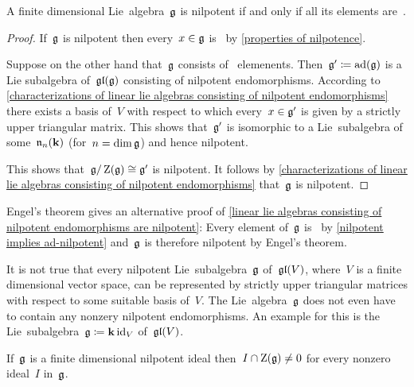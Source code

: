 \begin{theorem}[Engel]
  A finite dimensional Lie~algebra~$\mathfrak{g}$ is nilpotent if and only if all its elements are~{\adnilpotent}.
\end{theorem}


\begin{proof}
  If~$\mathfrak{g}$ is nilpotent then every~$x \in \mathfrak{g}$ is~{\adnilpotent} by \cref{properties of nilpotence}.
 
  Suppose on the other hand that~$\mathfrak{g}$ consists of~{\adnilpotent} elemenents.
  Then~$\mathfrak{g}' \coloneqq \operatorname{ad}(\mathfrak{g})$ is a Lie subalgebra of~$\mathfrak{gl}(\mathfrak{g})$ consisting of nilpotent endomorphisms.
  According to \cref{characterizations of linear lie algebras consisting of nilpotent endomorphisms} there exists a basis of~$V$ with respect to which every~$x \in \mathfrak{g}'$ is given by a strictly upper triangular matrix.
  This shows that~$\mathfrak{g}'$ is isomorphic to a Lie~subalgebra of some~$\mathfrak{n}_n(\mathbf{k})$ (for~$n = \dim \mathfrak{g}$) and hence nilpotent.
  
  This shows that~$\mathfrak{g}/\operatorname{Z}(\mathfrak{g}) \cong \mathfrak{g}'$ is nilpotent.
  It follows by \cref{characterizations of linear lie algebras consisting of nilpotent endomorphisms} that~$\mathfrak{g}$ is nilpotent.
\end{proof}


\begin{remark}
  Engel’s theorem gives an alternative proof of \cref{linear lie algebras consisting of nilpotent endomorphisms are nilpotent}:
  Every element of~$\mathfrak{g}$ is~{\adnilpotent} by \cref{nilpotent implies ad-nilpotent} and~$\mathfrak{g}$ is therefore nilpotent by Engel’s theorem.
\end{remark}


\begin{remark}
  It is not true that every nilpotent Lie~subalgebra~$\mathfrak{g}$ of~$\mathfrak{gl}(V)$, where~$V$ is a finite dimensional vector space, can be represented by strictly upper triangular matrices with respect to some suitable basis of~$V$.
  The Lie~algebra~$\mathfrak{g}$ does not even have to contain any nonzery nilpotent endomorphisms.
  An example for this is the {\onedimensional} Lie~subalgebra~$\mathfrak{g} \coloneqq \mathbf{k} \, {\operatorname{id}_V}$ of~$\mathfrak{gl}(V)$.
\end{remark}


\begin{corollary}
  \label{ideals in nilpotent does intersection center}
  If~$\mathfrak{g}$ is a finite dimensional nilpotent ideal then~$I \cap \operatorname{Z}(\mathfrak{g}) \neq 0$ for every nonzero ideal~$I$ in~$\mathfrak{g}$.
\end{corollary}


